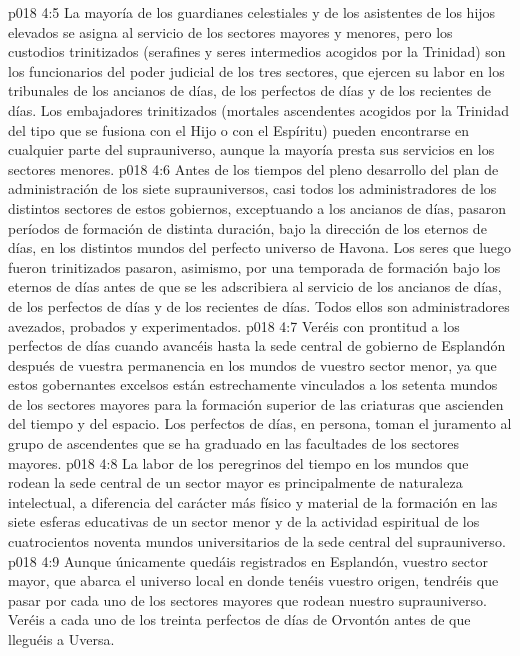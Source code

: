 \vs p018 4:5 La mayoría de los guardianes celestiales y de los asistentes de los hijos elevados se asigna al servicio de los sectores mayores y menores, pero los custodios trinitizados (serafines y seres intermedios acogidos por la Trinidad) son los funcionarios del poder judicial de los tres sectores, que ejercen su labor en los tribunales de los ancianos de días, de los perfectos de días y de los recientes de días. Los embajadores trinitizados (mortales ascendentes acogidos por la Trinidad del tipo que se fusiona con el Hijo o con el Espíritu) pueden encontrarse en cualquier parte del suprauniverso, aunque la mayoría presta sus servicios en los sectores menores.
\vs p018 4:6 Antes de los tiempos del pleno desarrollo del plan de administración de los siete suprauniversos, casi todos los administradores de los distintos sectores de estos gobiernos, exceptuando a los ancianos de días, pasaron períodos de formación de distinta duración, bajo la dirección de los eternos de días, en los distintos mundos del perfecto universo de Havona. Los seres que luego fueron trinitizados pasaron, asimismo, por una temporada de formación bajo los eternos de días antes de que se les adscribiera al servicio de los ancianos de días, de los perfectos de días y de los recientes de días. Todos ellos son administradores avezados, probados y experimentados.
\vs p018 4:7 \pc Veréis con prontitud a los perfectos de días cuando avancéis hasta la sede central de gobierno de Esplandón después de vuestra permanencia en los mundos de vuestro sector menor, ya que estos gobernantes excelsos están estrechamente vinculados a los setenta mundos de los sectores mayores para la formación superior de las criaturas que ascienden del tiempo y del espacio. Los perfectos de días, en persona, toman el juramento al grupo de ascendentes que se ha graduado en las facultades de los sectores mayores.
\vs p018 4:8 La labor de los peregrinos del tiempo en los mundos que rodean la sede central de un sector mayor es principalmente de naturaleza intelectual, a diferencia del carácter más físico y material de la formación en las siete esferas educativas de un sector menor y de la actividad espiritual de los cuatrocientos noventa mundos universitarios de la sede central del suprauniverso.
\vs p018 4:9 Aunque únicamente quedáis registrados en Esplandón, vuestro sector mayor, que abarca el universo local en donde tenéis vuestro origen, tendréis que pasar por cada uno de los sectores mayores que rodean nuestro suprauniverso. Veréis a cada uno de los treinta perfectos de días de Orvontón antes de que lleguéis a Uversa.
